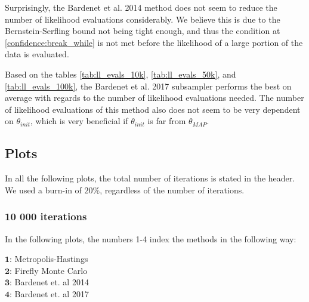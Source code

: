 Surprisingly, the Bardenet et al. 2014 method does not seem to reduce the number of likelihood evaluations considerably. We believe this is due to the Bernstein-Serfling bound not being tight enough, and thus the condition at \ref{confidence:break_while} is not met before the likelihood of a large portion of the data is evaluated. 

Based on the tables \ref{tab:ll_evals_10k}, \ref{tab:ll_evals_50k}, and \ref{tab:ll_evals_100k}, the Bardenet et al. 2017 subsampler performs the best on average with regards to the number of likelihood evaluations needed. The number of likelihood evaluations of this method also does not seem to be very dependent on $\theta_{init}$, which is very beneficial if $\theta_{init}$ is far from $\theta_{MAP}$. 



\subsection{Plots}
In all the following plots, the total number of iterations is stated in the header. We used a burn-in of $20\%$, regardless of the number of iterations. 
\subsubsection{10 000 iterations}
In the following plots, the numbers 1-4 index the methods in the following way: \\
\begin{centering}
$\mathbf{1}$:  Metropolis-Hastings \\
$\mathbf{2}$: Firefly Monte Carlo  \\
$\mathbf{3}$: Bardenet et. al 2014 \\
$\mathbf{4}$: Bardenet et. al 2017 \\
\end{centering}


